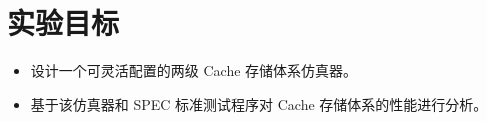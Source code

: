 
\section{实验目标}
\begin{itemize}
    \item 设计一个可灵活配置的两级 Cache 存储体系仿真器。 
    \item 基于该仿真器和 SPEC 标准测试程序对 Cache 存储体系的性能进行分析。 
\end{itemize}

